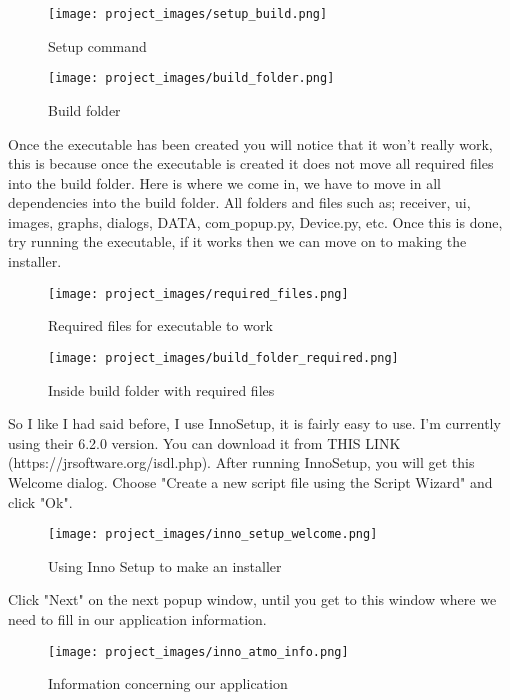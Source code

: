 \begin{figure}[H]
\centering
\texttt{[image: project\_images/setup\_build.png]}
 \caption{Setup command}
 \label{fig:setup command}
\end{figure}	

\begin{figure}[H]
\centering
\texttt{[image: project\_images/build\_folder.png]}
 \caption{Build folder}
 \label{fig:build folder}
\end{figure}	
	
	Once the executable has been created you will notice that it won't really work, this is because once the executable is created it does not move all required files into the build folder. Here is where we come in, we have to move in all dependencies into the build folder. All folders and files such as; receiver, ui, images, graphs, dialogs, DATA, com$\_$popup.py, Device.py, etc. Once this is done, try running the executable, if it works then we can move on to making the installer.

\begin{figure}[H]
\centering
\texttt{[image: project\_images/required\_files.png]}
 \caption{Required files for executable to work}
 \label{fig:required files}
\end{figure}	

\begin{figure}[H]
\centering
\texttt{[image: project\_images/build\_folder\_required.png]}
 \caption{Inside build folder with required files}
 \label{fig:required files in build folder}
\end{figure}	

	So I like I had said before, I use InnoSetup, it is fairly easy to use. I'm currently using their 6.2.0 version. You can download it from THIS LINK (https://jrsoftware.org/isdl.php).
	After running InnoSetup, you will get this Welcome dialog. Choose "Create a new script file using the Script Wizard" and click "Ok".

\begin{figure}[H]
\centering
\texttt{[image: project\_images/inno\_setup\_welcome.png]}
 \caption{Using Inno Setup to make an installer}
 \label{fig:inno setup welcome}
\end{figure}

	Click "Next" on the next popup window, until you get to this window where we need to fill in our application information.

\begin{figure}[H]
\centering
\texttt{[image: project\_images/inno\_atmo\_info.png]}
 \caption{Information concerning our application}
 \label{fig:inno atmo info}
\end{figure}

